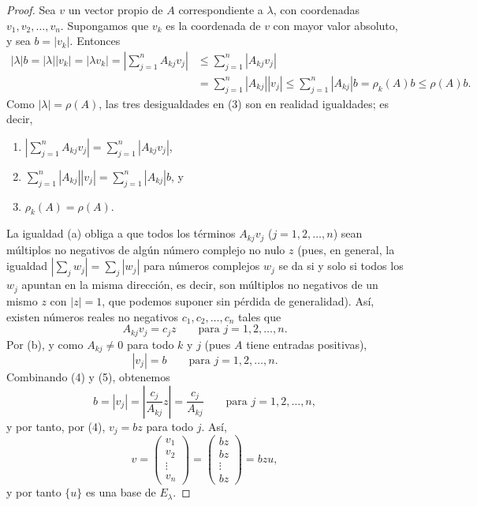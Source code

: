 \documentclass[12pt,a4paper]{book}
\begin{document}
    \begin{proof}
        Sea $v$ un vector propio de $A$ correspondiente a $\lambda$, con coordenadas $v_1,v_2,\dots,v_n$. Supongamos que $v_k$ es la coordenada de $v$ con mayor valor absoluto, y sea $b=|v_k|$. Entonces
        \begin{align*}
            |\lambda|b=|\lambda||v_k|=|\lambda v_k|=\left|\sum_{j=1}^{n}A_{kj}v_j\right|
            &\leq\sum_{j=1}^{n}|A_{kj}v_j|\\
            &=\sum_{j=1}^{n}|A_{kj}||v_j|\leq\sum_{j=1}^{n}|A_{kj}|b=\rho_k(A)b\leq\rho(A)b. \tag{3}
        \end{align*}
        Como $|\lambda|=\rho(A)$, las tres desigualdades en (3) son en realidad igualdades; es decir,
        \begin{enumerate}
            \item[(a)] $\left|\sum_{j=1}^{n}A_{kj}v_j\right|=\sum_{j=1}^{n}|A_{kj}v_j|$,
            \item[(b)] $\sum_{j=1}^{n}|A_{kj}||v_j|=\sum_{j=1}^{n}|A_{kj}|b$, y
            \item[(c)] $\rho_k(A)=\rho(A)$.
        \end{enumerate}
        La igualdad (a) obliga a que todos los términos $A_{kj}v_j$ ($j=1,2,\dots,n$) sean múltiplos no negativos de algún número complejo no nulo $z$ (pues, en general, la igualdad $|\sum_j w_j|=\sum_j|w_j|$ para números complejos $w_j$ se da si y solo si todos los $w_j$ apuntan en la misma dirección, es decir, son múltiplos no negativos de un mismo $z$ con $|z|=1$, que podemos suponer sin pérdida de generalidad). Así, existen números reales no negativos $c_1,c_2,\dots,c_n$ tales que
        \begin{equation*}
            A_{kj}v_j=c_jz \qquad\text{para } j=1,2,\dots,n. \tag{4}
        \end{equation*}
        Por (b), y como $A_{kj}\neq 0$ para todo $k$ y $j$ (pues $A$ tiene entradas positivas),
        \begin{equation*}
            |v_j|=b \qquad\text{para } j=1,2,\dots,n. \tag{5}
        \end{equation*}
        Combinando (4) y (5), obtenemos
        \begin{equation*}
            b=|v_j|=\left|\frac{c_j}{A_{kj}}z\right|=\frac{c_j}{A_{kj}} \qquad\text{para } j=1,2,\dots,n,
        \end{equation*}
        y por tanto, por (4), $v_j=bz$ para todo $j$. Así,
        \begin{equation*}
            v=\begin{pmatrix}v_1\\v_2\\\vdots\\v_n\end{pmatrix}=\begin{pmatrix}bz\\bz\\\vdots\\bz\end{pmatrix}=bzu,
        \end{equation*}
        y por tanto $\{u\}$ es una base de $E_\lambda$.


\end{proof}
\end{document}

